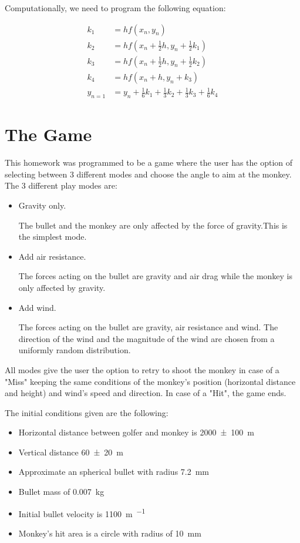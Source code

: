 Computationally, we need to program the following equation:

\begin{align*}
    k_1 &= hf(x_n, y_n)\\
    k_2 &= hf(x_n + \frac{1}{2}h, y_n + \frac{1}{2}k_1)\\
    k_3 &= hf(x_n + \frac{1}{2}h, y_n + \frac{1}{2}k_2)\\
    k_4 &= hf(x_n + h,y_n + k_3)\\
    y_{n=1} &= y_n + \frac{1}{6}k_1 + \frac{1}{3}k_2 + \frac{1}{3}k_3 + \frac{1}{6}k_4
\end{align*}



\section*{The Game}
This homework was programmed to be a game where the user has the option of selecting between 3 different modes and choose the angle to aim at the monkey. The 3 different play modes are:

\begin{itemize}
    \item Gravity only. 
    
    The bullet and the monkey are only affected by the force of gravity.This is the simplest mode. 
    
    \item Add air resistance.
    
    The forces acting on the bullet are gravity and air drag while the monkey is only affected by gravity. 
    
    \item Add wind.
    
    The forces acting on the bullet are gravity, air resistance and wind. The direction of the wind and the magnitude of the wind are chosen from a uniformly random distribution.
\end{itemize}

All modes give the user the option to retry to shoot the monkey in case of a "Miss" keeping the same conditions of the monkey's position (horizontal distance and height) and wind's speed and direction. In case of a "Hit", the game ends.

The initial conditions given are the following:

\begin{itemize}
    \item Horizontal distance between golfer and monkey is \SI{2000\pm 100}{\m}
    \item Vertical distance \SI{60 \pm 20}{\m}
    \item Approximate an spherical bullet with radius \SI{7.2}{\mm}
    \item Bullet mass of \SI{0.007}{\kilo\gram}
    \item Initial bullet velocity is \SI{1100}{\m\per\sec}
    \item Monkey's hit area is a circle with radius of \SI{10}{\mm}
\end{itemize}

